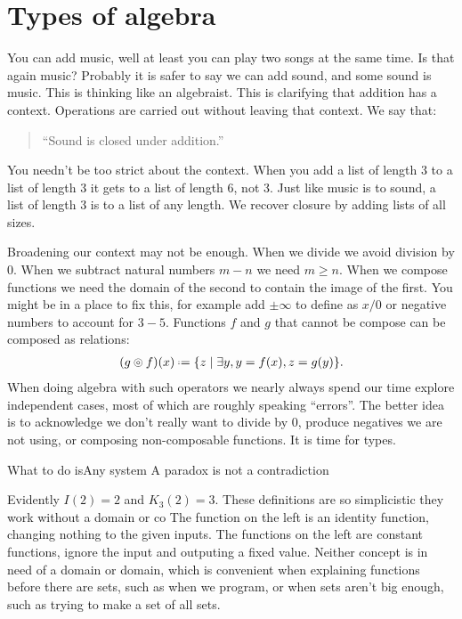 \chapter{Types of algebra}

You can add music, well at least you can play two songs at the same time.
Is that again music?  Probably it is safer to say we can add sound, and 
some sound is music.  This is thinking like an algebraist.  This is 
clarifying that addition has a context.  Operations are carried out 
without leaving that context.  We say that:
\begin{quote}
    ``Sound is closed under addition.''
\end{quote}
You needn't be too strict about the context.
When you add a list of length 3 to a 
list of length 3 it gets to a list of length 6, not 3.
Just like music is to sound, a list of length 3 is to a list of any length.
We recover closure by adding lists of all sizes.

Broadening our context may not be enough.  When we divide 
we avoid division by $0$.  When we subtract natural numbers $m-n$
we need $m\geq n$.  When we compose functions we need the 
domain of the second to contain the image of the first.
You might be in a place to fix this, for example add $\pm\infty$ 
to define as $x/0$ or negative numbers to account for $3-5$.
Functions $f$ and $g$ that cannot be compose can be composed as relations:
\begin{align*}
    (g\circledcirc f)(x) \defeq \{z\mid \exists y, y=f(x), z=g(y)\}.
\end{align*}
When doing algebra with such operators we nearly always spend 
our time explore independent cases, most of which are 
roughly speaking ``errors''.  The better idea is to acknowledge 
we don't really want to divide by 0, produce negatives we are not using,
or composing non-composable functions.  It is time for types.



What to do isAny system 
A paradox is not a contradiction


Evidently $I(2)=2$ and $K_3(2)=3$.  These definitions are so simplicistic 
they work without a domain or co
The function on the left is an identity function, changing nothing 
to the given inputs.  The functions on the left are constant functions, 
ignore the input and outputing a fixed value.  Neither concept 
is in need of a domain or domain, which is convenient when explaining 
functions before there are sets, such as when we program, or when sets 
aren't big enough, such as trying to make a set of all sets.


